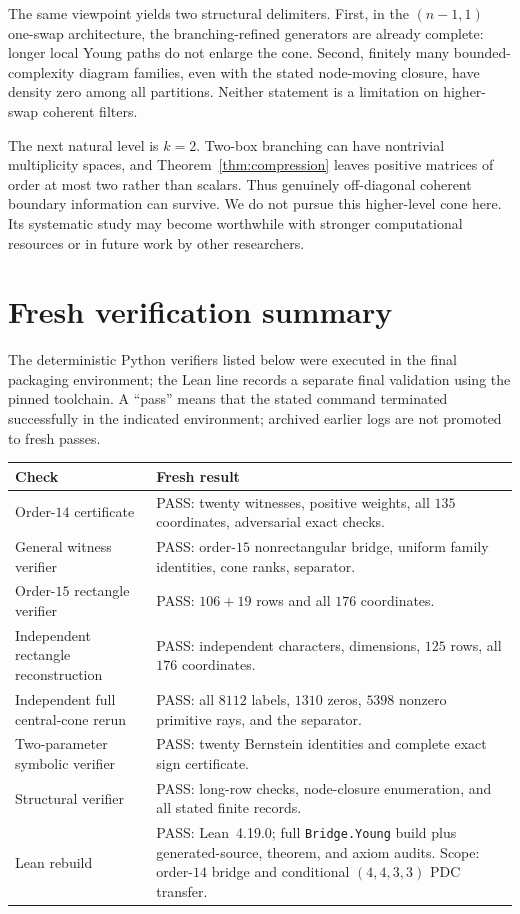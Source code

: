 \documentclass[11pt]{article}
\theoremstyle{definition}
\begin{document}
The same viewpoint yields two structural delimiters.  First, in the $(n-1,1)$ one-swap architecture, the branching-refined generators are already complete: longer local Young paths do not enlarge the cone.  Second, finitely many bounded-complexity diagram families, even with the stated node-moving closure, have density zero among all partitions.  Neither statement is a limitation on higher-swap coherent filters.

The next natural level is $k=2$.  Two-box branching can have nontrivial multiplicity spaces, and Theorem~\ref{thm:compression} leaves positive matrices of order at most two rather than scalars.  Thus genuinely off-diagonal coherent boundary information can survive.  We do not pursue this higher-level cone here.  Its systematic study may become worthwhile with stronger computational resources or in future work by other researchers.

\appendix
\section{Fresh verification summary}
The deterministic Python verifiers listed below were executed in the final packaging environment; the Lean line records a separate final validation using the pinned toolchain.  A ``pass'' means that the stated command terminated successfully in the indicated environment; archived earlier logs are not promoted to fresh passes.

\begin{center}\small
\begin{tabular}{p{}p{}}
\toprule
Check & Fresh result\\
\midrule
Order-$14$ certificate & PASS: twenty witnesses, positive weights, all $135$ coordinates, adversarial exact checks.\\
General witness verifier & PASS: order-$15$ nonrectangular bridge, uniform family identities, cone ranks, separator.\\
Order-$15$ rectangle verifier & PASS: $106+19$ rows and all $176$ coordinates.\\
Independent rectangle reconstruction & PASS: independent characters, dimensions, $125$ rows, all $176$ coordinates.\\
Independent full central-cone rerun & PASS: all $8112$ labels, $1310$ zeros, $5398$ nonzero primitive rays, and the separator.\\
Two-parameter symbolic verifier & PASS: twenty Bernstein identities and complete exact sign certificate.\\
Structural verifier & PASS: long-row checks, node-closure enumeration, and all stated finite records.\\
Lean rebuild & PASS: Lean~4.19.0; full \texttt{Bridge.Young} build plus generated-source, theorem, and axiom audits.  Scope: order-$14$ bridge and conditional $(4,4,3,3)$ PDC transfer.\\
\bottomrule
\end{tabular}
\end{center}
\end{document}
